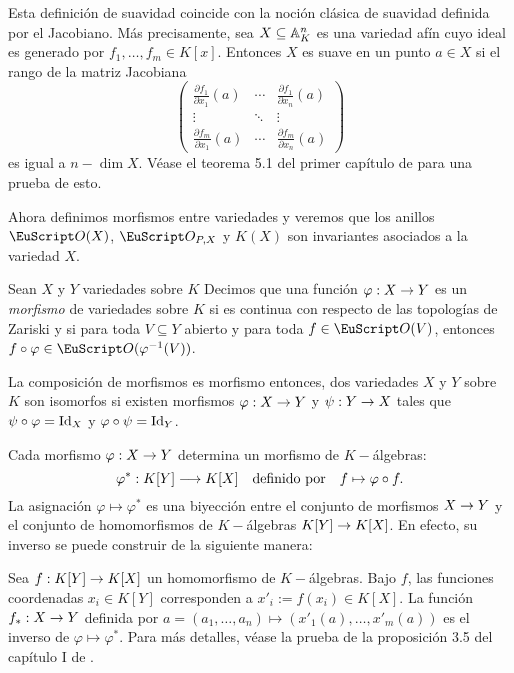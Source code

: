 \documentclass[../../tesis_maestria]{subfiles}
\begin{document}
\begin{nota}
	Esta definición de suavidad coincide con la noción clásica de suavidad definida por el Jacobiano. Más precisamente, sea $X\subseteq\mathbb{A}^n_K$ es una variedad afín cuyo ideal es generado por $f_1,\ldots,f_m\in K[x]$. Entonces $X$ es suave en un punto $a\in X$ si el rango de la matriz Jacobiana
	\[
		\begin{pmatrix}
		\tfrac{\partial f_1}{\partial x_1}(a) & \cdots & \tfrac{\partial f_1}{\partial x_n}(a) \\
		\vdots & \ddots & \vdots \\
		\tfrac{\partial f_m}{\partial x_1}(a) & \cdots & \tfrac{\partial f_m}{\partial x_n}(a)
		\end{pmatrix}
	\]
	es igual a $n-\dim X$. Véase el teorema 5.1 del primer capítulo de \cite{HartshorneAG} para una prueba de esto.
\end{nota}

Ahora definimos morfismos entre variedades y veremos que los anillos $\Oo(X)$, $\Oo_{P,X}$ y $K(X)$ son invariantes asociados a la variedad $X$.

\begin{defin}
	Sean $X$ y $Y$ variedades sobre $K$ Decimos que una función $\varphi:X\rightarrow Y$ es un \emph{morfismo} de variedades sobre $K$ si es continua con respecto de las topologías de Zariski y si para toda $V\subseteq Y$ abierto y para toda $f\in\Oo(V)$, entonces $f\circ\varphi\in\Oo(\varphi^{-1}(V))$.
\end{defin}

\begin{nota}
	La composición de morfismos es morfismo entonces, dos variedades $X$ y $Y$ sobre $K$ son isomorfos si existen morfismos $\varphi:X\rightarrow Y$ y $\psi: Y\rightarrow X$ tales que $\psi\circ\varphi=\mathrm{Id}_X$ y $\varphi\circ\psi=\mathrm{Id}_Y$.
\end{nota}

Cada morfismo $\varphi: X\rightarrow Y$ determina un morfismo de $K-$álgebras:
\begin{equation}\label{eq:morf-inducido-coord}
	\varphi^*:K[Y]\longrightarrow K[X] \quad\text{definido por}\quad f\mapsto\varphi\circ f.
\end{equation}
La asignación $\varphi\mapsto\varphi^*$ es una biyección entre el conjunto de morfismos $X\rightarrow Y$ y el conjunto de homomorfismos de $K-$álgebras $K[Y]\rightarrow K[X]$. En efecto, su inverso se puede construir de la siguiente manera:

Sea $f:K[Y]\rightarrow K[X]$ un homomorfismo de $K-$álgebras. Bajo $f$, las funciones coordenadas $x_i\in K[Y]$ corresponden a $x'_i:=f(x_i)\in K[X]$. La función $f_*:X\rightarrow Y$ definida por $a=(a_1,\ldots,a_n)\mapsto(x'_1(a),\ldots,x'_m(a))$ es el inverso de $\varphi\mapsto \varphi^*$. Para más detalles, véase la prueba de la proposición 3.5 del capítulo I de \cite{HartshorneAG}.
\end{document}
